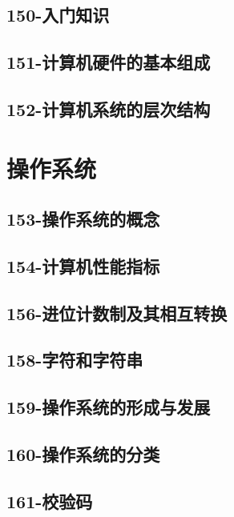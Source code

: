 \subsection{150-入门知识}

\subsection{151-计算机硬件的基本组成}

\subsection{152-计算机系统的层次结构}


\section{操作系统}

\subsection{153-操作系统的概念}

\subsection{154-计算机性能指标}

\subsection{156-进位计数制及其相互转换}

\subsection{158-字符和字符串}

\subsection{159-操作系统的形成与发展}

\subsection{160-操作系统的分类}

\subsection{161-校验码}

